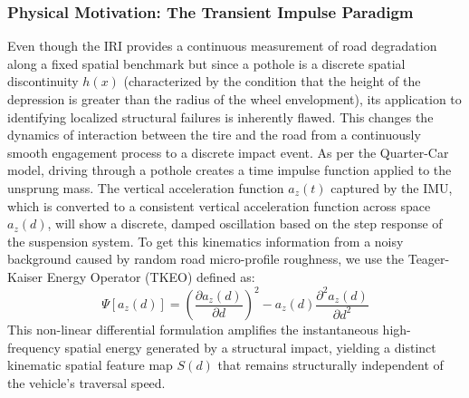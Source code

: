 \documentclass[conference]{IEEEtran}
\begin{document}
\subsubsection{Physical Motivation: The Transient Impulse Paradigm}
Even though the IRI provides a continuous measurement of road degradation along a fixed spatial benchmark but since a pothole is a discrete spatial 
discontinuity $h(x)$ (characterized by the condition that the height of the depression is greater than the radius of the wheel envelopment), its application to identifying localized structural failures is inherently flawed.
This changes the dynamics of interaction between the tire and the road from a continuously smooth engagement process to a discrete impact event.
As per the Quarter-Car model, driving through a pothole creates a time impulse function applied to the unsprung mass.
The vertical acceleration function $a_z(t)$ captured by the IMU, which is converted to a consistent vertical acceleration function across space $a_z(d)$, will show a discrete, damped oscillation based on the step response of the suspension system.
To get this kinematics information from a noisy background caused by random road micro-profile roughness, we use the Teager-Kaiser Energy Operator (TKEO) defined as:
\begin{equation}
    \Psi[a_z(d)] = \left( \frac{\partial a_z(d)}{\partial d} \right)^2 - a_z(d) \frac{\partial^2 a_z(d)}{\partial d^2}
\end{equation}
This non-linear differential formulation amplifies the instantaneous high-frequency spatial energy generated by a structural impact, yielding a distinct kinematic spatial feature map $S(d)$ that remains structurally independent of the vehicle's traversal speed.
\end{document}
